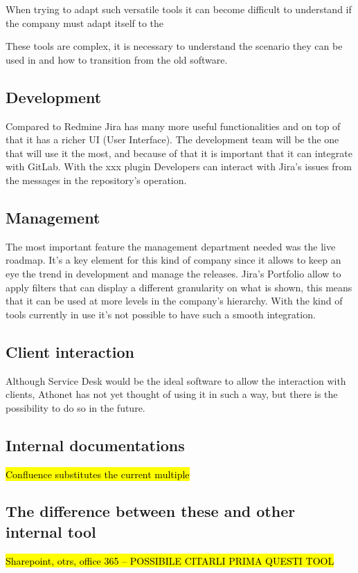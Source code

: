 	When trying to adapt such versatile tools it can become difficult to understand if the company must adapt itself to the 
	
	These tools are complex, it is necessary to understand the scenario they can be used in and how to transition from the old software.

	\subsection{Development} 
		Compared to Redmine Jira has many more useful functionalities and on top of that it has a richer UI (User Interface).
		The development team will be the one that will use it the most, and because of that it is important that it can integrate with GitLab.
		With the xxx plugin Developers can interact with Jira's issues from the messages in the repository's operation.
	
	\subsection{Management} 
		The most important feature the management department needed was the live roadmap.	
		It's a key element for this kind of company since it allows to keep an eye the trend in development and manage the releases.
		Jira's Portfolio allow to apply filters that can display a different granularity on what is shown, this means that it can be used at more levels in the company's hierarchy.
		With the kind of tools currently in use it's not possible to have such a smooth integration.
	
	\subsection{Client interaction} 
		Although Service Desk would be the ideal software to allow the interaction with clients, Athonet has not yet thought of using it in such a way, but there is the possibility to do so in the future.
		
	\subsection{Internal documentations}
		\hl{Confluence substitutes the current multiple }
		
	\subsection{The difference between these and other internal tool}
		\hl{Sharepoint, otrs, office 365 -- POSSIBILE CITARLI PRIMA QUESTI TOOL }


